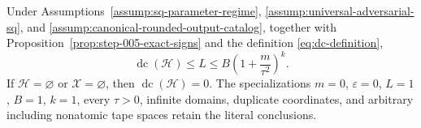 \begin{proposition}
\label{prop:step-005-dimension-closure}
Under Assumptions~\ref{assump:sq-parameter-regime},
\ref{assump:universal-adversarial-sq}, and
\ref{assump:canonical-rounded-output-catalog}, together with
Proposition~\ref{prop:step-005-exact-signs} and the definition
\eqref{eq:dc-definition},
\begin{equation}
\operatorname{dc}(\mathcal H)
\le L
\le B\left(1+\frac{m}{\tau^2}\right)^k.
\label{eq:step-005-dimension-closure}
\end{equation}
If \(\mathcal H=\varnothing\) or \(\mathcal X=\varnothing\), then
\(\operatorname{dc}(\mathcal H)=0\).  The specializations \(m=0\),
\(\varepsilon=0\), \(L=1\), \(B=1\), \(k=1\), every \(\tau>0\),
infinite domains, duplicate coordinates, and arbitrary including nonatomic
tape spaces retain the literal conclusions.
\end{proposition}

